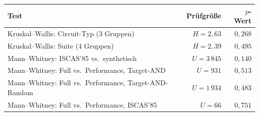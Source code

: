 \begin{tabular}{lrr}
\toprule
Test & Prüfgröße & $p$-Wert \\
\midrule
Kruskal--Wallis: Circuit-Typ (3 Gruppen) & $H=2{,}63$ & $0{,}268$ \\
Kruskal--Wallis: Suite (4 Gruppen) & $H=2{,}39$ & $0{,}495$ \\
Mann--Whitney: ISCAS'85 vs.\ synthetisch & $U=3\,845$ & $0{,}140$ \\
Mann--Whitney: Full vs.\ Performance, Target-AND & $U=931$ & $0{,}513$ \\
Mann--Whitney: Full vs.\ Performance, Target-AND-Random & $U=1\,934$ & $0{,}483$ \\
Mann--Whitney: Full vs.\ Performance, ISCAS'85 & $U=66$ & $0{,}751$ \\
\bottomrule
\end{tabular}
